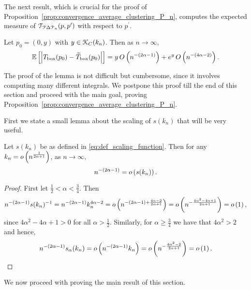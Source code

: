   

The next result, which is crucial for the proof of Proposition~\ref{prop:convergence_average_clustering_P_n}, computes the expected measure of $\mathcal{T}_{{\mathcal P} \Delta {\mathcal P}_n}(p,p^\prime)$ with respect to $p^\prime$. 

\begin{lemma}\label{lem:clustering_error_T_term}
Let $p_0 = (0,y)$ with $y \in {\mathcal K}_{C}(k_n)$. Then as $n \to \infty$,
\[
	\mathbb{E}\left[\left|T_{\text{box}}(p_0) - \widetilde{T}_{\text{box}}(p_0)\right|\right]
	= y \, O\left(n^{-(2\alpha - 1)}\right) + e^{y}\,O\left(n^{-(4\alpha-2)}\right).
\]
\end{lemma}

The proof of the lemma is not difficult but cumbersome, since it involves computing many different integrals. We postpone this proof till the end of this section and proceed with the main goal, proving Proposition~\ref{prop:convergence_average_clustering_P_n}. 

First we state a small lemma about the scaling of $s(k_n)$ that will be very useful.  

\begin{lemma}\label{lem:scaling_s_alpha}
Let $s(k_n)$ be as defined in \eqref{eq:def_scaling_function}. Then for any $k_n = o\left(n^{\frac{1}{2\alpha + 1}}\right)$, as $n \to \infty$,
\[
	n^{-(2\alpha - 1)} = o\left(s(k_n)\right).
\]
\end{lemma}

\begin{proof}
First let $\frac{1}{2} < \alpha < \frac{3}{4}$. Then
\[
	n^{-(2\alpha - 1)}s(k_n)^{-1} = n^{-(2\alpha -1)}k_n^{4\alpha - 2}
	= o\left(n^{-(2\alpha - 1) + \frac{4\alpha - 2}{2\alpha + 1}}\right) 
	= o\left(n^{-\frac{4\alpha^2 - 4\alpha + 1}{2\alpha + 1}}\right)
	= o\left(1\right),
\]
since $4\alpha^2 - 4\alpha + 1 > 0$ for all $\alpha > \frac{1}{2}$. Similarly, for $\alpha \ge \frac{3}{4}$ we have
that $4\alpha^2 > 2$ and hence,
\[
	n^{-(2\alpha - 1)} s_{\alpha}(k_n) = o\left(n^{-(2\alpha - 1)} k_n\right) = o\left(n^{-\frac{4\alpha^2 - 2}{2\alpha + 1}}\right)
	= o\left(1\right).
\]
\end{proof}

We now proceed with proving the main result of this section.

